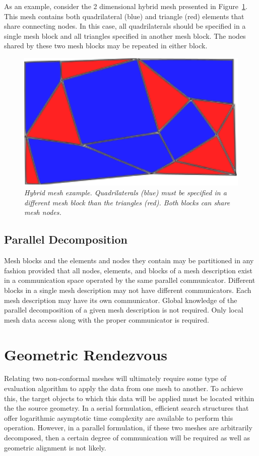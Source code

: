 \documentclass[letterpaper,12pt]{article}
\begin{document}
As an example, consider the 2 dimensional hybrid mesh presented in
Figure~\ref{fig:hybrid_mesh}. This mesh contains both quadrilateral
(blue) and triangle (red) elements that share connecting nodes. In
this case, all quadrilaterals should be specified in a single mesh
block and all triangles specified in another mesh block. The nodes
shared by these two mesh blocks may be repeated in either block.

\begin{figure}[htpb!]
  \centering
  \includegraphics[width=5in]{hybrid_mesh.eps}
  \caption{\sl Hybrid mesh example. Quadrilaterals (blue) must be
    specified in a different mesh block than the triangles (red). Both
    blocks can share mesh nodes.}
  \label{fig:hybrid_mesh}
\end{figure}

\subsection{Parallel Decomposition}\label{subsec:mesh_decomp}
Mesh blocks and the elements and nodes they contain may be partitioned
in any fashion provided that all nodes, elements, and blocks of a mesh
description exist in a communication space operated by the same
parallel communicator. Different blocks in a single mesh description
may not have different communicators. Each mesh description may have
its own communicator. Global knowledge of the parallel decomposition
of a given mesh description is not required. Only local mesh data
access along with the proper communicator is required.

\clearpage

\section{Geometric Rendezvous}\label{sec:rendezvous}
Relating two non-conformal meshes will ultimately require some type of
evaluation algorithm to apply the data from one mesh to another. To
achieve this, the target objects to which this data will be applied
must be located within the the source geometry. In a serial
formulation, efficient search structures that offer logarithmic
asymptotic time complexity are available to perform this
operation. However, in a parallel formulation, if these two meshes are
arbitrarily decomposed, then a certain degree of communication will be
required as well as geometric alignment is not likely.
\end{document}
